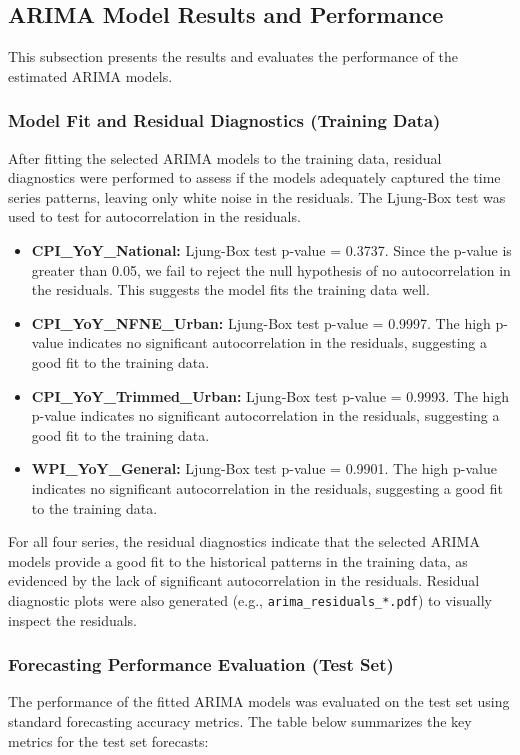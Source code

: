 \documentclass[12pt,a4paper]{article}
\begin{document}
\subsection{ARIMA Model Results and Performance}

This subsection presents the results and evaluates the performance of the estimated ARIMA models.

\subsubsection{Model Fit and Residual Diagnostics (Training Data)}
After fitting the selected ARIMA models to the training data, residual diagnostics were performed to assess if the models adequately captured the time series patterns, leaving only white noise in the residuals. The Ljung-Box test was used to test for autocorrelation in the residuals.

\begin{itemize}
    \item \textbf{CPI\_YoY\_National:} Ljung-Box test p-value = 0.3737. Since the p-value is greater than 0.05, we fail to reject the null hypothesis of no autocorrelation in the residuals. This suggests the model fits the training data well.
    \item \textbf{CPI\_YoY\_NFNE\_Urban:} Ljung-Box test p-value = 0.9997. The high p-value indicates no significant autocorrelation in the residuals, suggesting a good fit to the training data.
    \item \textbf{CPI\_YoY\_Trimmed\_Urban:} Ljung-Box test p-value = 0.9993. The high p-value indicates no significant autocorrelation in the residuals, suggesting a good fit to the training data.
    \item \textbf{WPI\_YoY\_General:} Ljung-Box test p-value = 0.9901. The high p-value indicates no significant autocorrelation in the residuals, suggesting a good fit to the training data.
\end{itemize}
For all four series, the residual diagnostics indicate that the selected ARIMA models provide a good fit to the historical patterns in the training data, as evidenced by the lack of significant autocorrelation in the residuals. Residual diagnostic plots were also generated (e.g., \texttt{arima\_residuals\_*.pdf}) to visually inspect the residuals.

\subsubsection{Forecasting Performance Evaluation (Test Set)}
The performance of the fitted ARIMA models was evaluated on the test set using standard forecasting accuracy metrics. The table below summarizes the key metrics for the test set forecasts:
\end{document}
